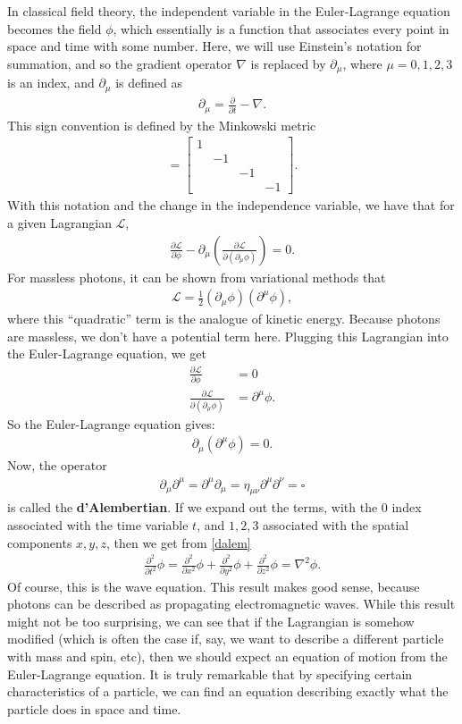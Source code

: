 \documentclass{article}
\newcommand{\p}{\partial}
\newcommand{\lag}{\mathcal{L}}
\newcommand{\f}[2]{\frac{#1}{#2}}
\begin{document}
In classical field theory, the independent variable in the Euler-Lagrange equation becomes the field $\phi$, which essentially is a function that associates every point in space and time with some number. Here, we will use Einstein's notation for summation, and so the gradient operator $\nabla$ is replaced by $\p_\mu$, where $\mu = 0,1,2,3$ is an index, and $\p_\mu$ is defined as
\begin{align}
\p_\mu = \f{\p}{\p t} - \nabla.
\end{align}
This sign convention is defined by the Minkowski metric
\begin{align}
[\eta_{\mu\nu}] = \begin{bmatrix}
1&&&\\
&-1&&\\
&&-1&\\
&&&-1
\end{bmatrix}.
\end{align}
With this notation and the change in the independence variable, we have that for a given Lagrangian $\lag$,
\begin{align}
\frac{\p \lag}{\p \phi} - \p_\mu\left( \frac{\p \lag}{\p(\p_\mu \phi)} \right) = 0.
\end{align}
For massless photons, it can be shown from variational methods that 
\begin{align}
\lag = \frac{1}{2}(\p_\mu\phi)(\p^\mu\phi),
\end{align}
where this ``quadratic'' term is the analogue of kinetic energy. Because photons are massless, we don't have a potential term here. Plugging this Lagrangian into the Euler-Lagrange equation, we get
\begin{align}
\frac{\p\lag}{\p\phi} &= 0\\
\frac{\p\lag}{\p(\p_\mu\phi)} &= \p^\mu\phi.
\end{align}
So the Euler-Lagrange equation gives:
\begin{align}\label{dalem}
\p_\mu(\p^\mu\phi) = 0.
\end{align}
Now, the operator  
\begin{align}
\p_\mu \p^\mu = \p^\mu\p_\mu = \eta_{\mu\nu}\p^\mu\p^\nu = \square
\end{align}
is called the \textbf{d'Alembertian}. If we expand out the terms, with the 0 index associated with the time variable $t$, and $1,2,3$ associated with the spatial components $x,y,z$, then we get from \eqref{dalem}
\begin{align}
\f{\p^2}{\p t^2}\phi = \f{\p^2}{\p x^2}\phi + \f{\p^2}{\p y^2}\phi + \f{\p^2}{\p z^2}\phi = \nabla^2\phi.
\end{align}
Of course, this is the wave equation. This result makes good sense, because photons can be described as propagating electromagnetic waves. While this result might not be too surprising, we can see that if the Lagrangian is somehow modified (which is often the case if, say, we want to describe a different particle with mass and spin, etc), then we should expect an equation of motion from the Euler-Lagrange equation. It is truly remarkable that by specifying certain characteristics of a particle, we can find an equation describing exactly what the particle does in space and time. 
\end{document}
